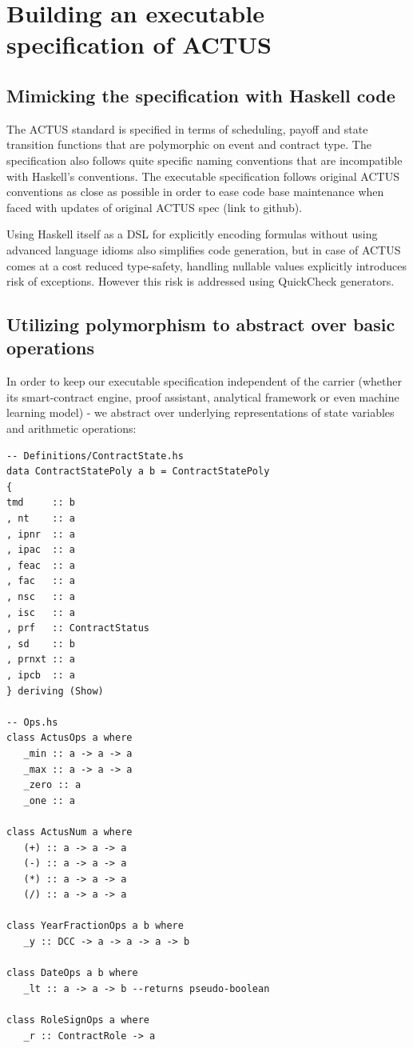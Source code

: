 \documentclass[runningheads]{llncs}
\begin{document}
\section{Building an executable specification of ACTUS}

\subsection{Mimicking the specification with Haskell code}

The ACTUS standard is specified in terms of scheduling, payoff and
state transition functions that are polymorphic on event and contract
type. The specification also follows quite specific naming conventions
that are incompatible with Haskell's conventions. The executable specification
follows original ACTUS conventions as close as possible in order to
ease code base maintenance when faced with updates of original ACTUS
spec (link to github).

Using Haskell itself as a DSL for explicitly encoding formulas without
using advanced language idioms also simplifies code generation, but
in case of ACTUS comes at a cost reduced type-safety, handling nullable
values explicitly introduces risk of exceptions. However this risk
is addressed using QuickCheck generators.

\subsection{Utilizing polymorphism to abstract over basic operations}

In order to keep our executable specification independent of the carrier
(whether its smart-contract engine, proof assistant, analytical framework
or even machine learning model) - we abstract over underlying representations
of state variables and arithmetic operations:

\begin{verbatim}
-- Definitions/ContractState.hs 
data ContractStatePoly a b = ContractStatePoly  
{  
tmd     :: b  
, nt    :: a  
, ipnr  :: a  
, ipac  :: a  
, feac  :: a  
, fac   :: a  
, nsc   :: a  
, isc   :: a  
, prf   :: ContractStatus  
, sd    :: b  
, prnxt :: a  
, ipcb  :: a  
} deriving (Show) 

-- Ops.hs
class ActusOps a where    
   _min :: a -> a -> a
   _max :: a -> a -> a
   _zero :: a
   _one :: a

class ActusNum a where
   (+) :: a -> a -> a
   (-) :: a -> a -> a
   (*) :: a -> a -> a
   (/) :: a -> a -> a

class YearFractionOps a b where
   _y :: DCC -> a -> a -> a -> b   

class DateOps a b where
   _lt :: a -> a -> b --returns pseudo-boolean   

class RoleSignOps a where
   _r :: ContractRole -> a
\end{verbatim}
\end{document}
